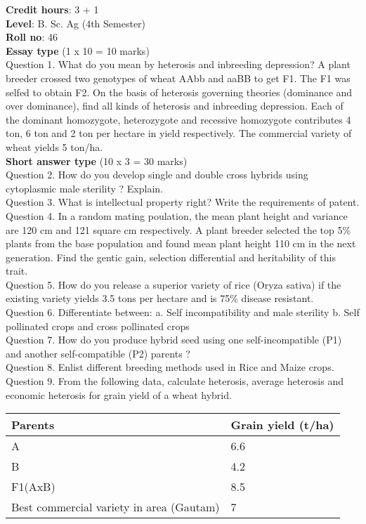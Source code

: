 \documentclass[12pt]{article}\usepackage[]{graphicx}\usepackage[]{color}
\begin{document}
\textbf{Credit hours}: 3 + 1 \\ 
\textbf{Level}: B. Sc. Ag (4th Semester) \\
\textbf{Roll no}: 46 \\[0.5cm] 
\textbf{Essay type} (1 x 10 = 10 marks) \\
Question 1. What do you mean by heterosis and inbreeding depression? A plant breeder crossed two genotypes of wheat AAbb and aaBB to get F1. The F1 was selfed to obtain F2. On the basis of heterosis governing theories (dominance and over dominance), find all kinds of heterosis and inbreeding depression. Each of the dominant homozygote, heterozygote and recessive homozygote contributes 4 ton, 6 ton and 2 ton per hectare in yield respectively. The commercial variety of wheat yields 5 ton/ha.\\
\textbf{Short answer type} (10 x 3 = 30 marks) \\
Question 2. How do you develop single and double cross hybrids using cytoplasmic male sterility ? Explain.\\
Question 3. What is intellectual property right? Write the requirements of patent.\\
Question 4. In a random mating poulation, the mean plant height and variance are 120 cm and 121 square cm respectively. A plant breeder selected the top 5\% plants from the base population and found mean plant height 110 cm in the next generation. Find the gentic gain, selection differential and heritability of this trait.\\
Question 5. How do you release a superior variety of rice (Oryza sativa) if the existing variety yields 3.5 tons per hectare and is 75\% disease resistant.\\
Question 6. Differentiate between: a. Self incompatibility and male sterility b. Self pollinated crops and cross pollinated crops\\
Question 7. How do you produce hybrid seed using one self-incompatible (P1) and another self-compatible (P2) parents ?\\
Question 8. Enlist different breeding methods used in Rice and Maize crops.\\
Question 9. From the following data, calculate heterosis, average heterosis and economic heterosis for grain yield of a wheat hybrid.\\ 
\begin{table}[H]
\centering\begingroup\fontsize{8}{10}\selectfont

\begin{tabular}[t]{ll}
\toprule
Parents & Grain yield (t/ha)\\
\midrule
A & 6.6\\
B & 4.2\\
F1(AxB) & 8.5\\
Best commercial variety in area (Gautam) & 7\\
\bottomrule
\end{tabular}
\endgroup{}
\end{table}
\end{document}
